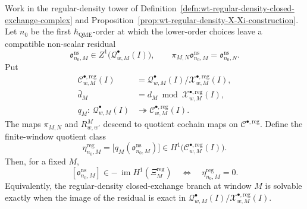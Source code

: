\begin{prop}
\label{prop:wt-Xi-reg-first-residual-quotient-obstruction}
  Work in the regular-density tower of
  Definition~\ref{defn:wt-regular-density-closed-exchange-complex} and
  Proposition~\ref{prop:wt-regular-density-X-Xi-construction}.  Let
  \(n_0\) be the first \(\hbar_{\mathrm{QME}}\)-order at which the lower-order choices
  leave a compatible non-scalar residual
  \[
    \mathfrak o^{\mathrm{ns}}_{n_0,M}
      \in Z^1\bigl(\mathcal Q^\bullet_{w,M}(I)\bigr),
      \qquad
    \pi_{M,N}\mathfrak o^{\mathrm{ns}}_{n_0,M}
      =
    \mathfrak o^{\mathrm{ns}}_{n_0,N}.
  \]
  Put
  \[
  \begin{aligned}
    \mathcal C^{\bullet,\mathrm{reg}}_{w,M}(I)
      &=
    \mathcal Q^\bullet_{w,M}(I)/
    \mathcal X^{\bullet,\mathrm{reg}}_{w,M}(I),\\
    \bar d_M
      &=
    d_M\bmod
    \mathcal X^{\bullet,\mathrm{reg}}_{w,M}(I),\\
    q_M\colon\,
    \mathcal Q^\bullet_{w,M}(I)
      &\twoheadrightarrow
    \mathcal C^{\bullet,\mathrm{reg}}_{w,M}(I).
  \end{aligned}
  \]
  The maps \(\pi_{M,N}\) and \(R^M_{w,w'}\) descend to quotient cochain
  maps on \(\mathcal C^{\bullet,\mathrm{reg}}\).  Define the finite-window
  quotient class
  \[
    \eta^{\mathrm{reg}}_{n_0,M}
      =
    \bigl[q_M(\mathfrak o^{\mathrm{ns}}_{n_0,M})\bigr]
      \in
    H^1\bigl(\mathcal C^{\bullet,\mathrm{reg}}_{w,M}(I)\bigr).
  \]
  Then, for a fixed \(M\),
  \[
    [\mathfrak o^{\mathrm{ns}}_{n_0,M}]
      \in
    -\,\operatorname{im}H^1(\Xi^{\mathrm{reg}}_M)
      \quad\Longleftrightarrow\quad
    \eta^{\mathrm{reg}}_{n_0,M}=0.
  \]
  Equivalently, the regular-density closed-exchange branch at window
  \(M\) is solvable exactly when the image of the residual is exact in
  \(\mathcal Q^\bullet_{w,M}(I)/
  \mathcal X^{\bullet,\mathrm{reg}}_{w,M}(I)\).


\end{prop}
